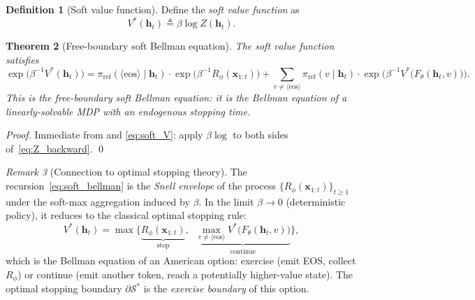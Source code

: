 \documentclass[11pt,a4paper]{article}
\theoremstyle{plain}
\newtheorem{theorem}{Theorem}[section]
\theoremstyle{definition}
\newtheorem{definition}[theorem]{Definition}
\theoremstyle{remark}
\newtheorem{remark}[theorem]{Remark}
\newcommand{\cS}{\mathcal{S}}
\begin{document}
\begin{definition}[Soft value function]
Define the \emph{soft value function} as
\begin{equation}\label{eq:soft_V}
  V^*(\bm{h}_t) \triangleq \beta \log Z(\bm{h}_t).
\end{equation}
\end{definition}

\begin{theorem}[Free-boundary soft Bellman equation]\label{thm:soft_bellman}
The soft value function satisfies
\begin{equation}\label{eq:soft_bellman}
  \exp\!\bigl(\beta^{-1} V^*(\bm{h}_t)\bigr)
  = \pi_{\mathrm{ref}}(\langle\mathrm{eos}\rangle \mid \bm{h}_t)
    \cdot \exp\!\bigl(\beta^{-1} R_\phi(\bm{x}_{1:t})\bigr)
  + \!\!\sum_{v \neq \langle\mathrm{eos}\rangle}\!\!
    \pi_{\mathrm{ref}}(v \mid \bm{h}_t)
    \cdot \exp\!\bigl(\beta^{-1} V^*\!\bigl(F_\theta(\bm{h}_t, v)\bigr)\bigr).
\end{equation}
This is the \emph{free-boundary} soft Bellman equation: it is the Bellman
equation of a linearly-solvable MDP with an endogenous stopping time.
\end{theorem}

\begin{proof}
Immediate from  and \eqref{eq:soft_V}: apply
$\beta \log$ to both sides of~\eqref{eq:Z_backward}. \qed
\end{proof}

\begin{remark}[Connection to optimal stopping theory]
The recursion~\eqref{eq:soft_bellman} is the \emph{Snell envelope} of the
process $\{R_\phi(\bm{x}_{1:t})\}_{t \geq 1}$ under the soft-max aggregation
induced by $\beta$. In the limit $\beta \to 0$ (deterministic policy), it
reduces to the classical optimal stopping rule:
\[
  V^*(\bm{h}_t)
  = \max\!\Big\{
      \underbrace{R_\phi(\bm{x}_{1:t})}_{\text{stop}},\;\;
      \underbrace{\max_{v \neq \langle\mathrm{eos}\rangle}
        V^*\!\bigl(F_\theta(\bm{h}_t, v)\bigr)}_{\text{continue}}
    \Big\},
\]
which is the Bellman equation of an American option: exercise (emit EOS,
collect $R_\phi$) or continue (emit another token, reach a potentially
higher-value state). The optimal stopping boundary $\partial\cS^*$ is
the \emph{exercise boundary} of this option.
\end{remark}
\end{document}
